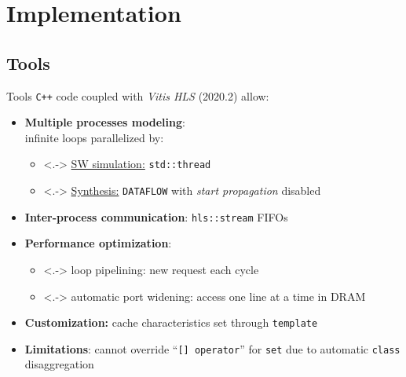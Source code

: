 \documentclass[handout]{beamer}
\begin{document}
\section{Implementation}
\subsection{Tools}
\begin{frame}{Tools}
	\texttt{C++} code coupled with \emph{Vitis HLS} (2020.2) allow:
	\pause
	\begin{itemize}[<+->]
		\item \textbf{Multiple processes modeling}:\\
			infinite loops parallelized by:
			\begin{itemize}
				\item<.-> \underline{SW simulation:} \texttt{std::thread}
				\item<.-> \underline{Synthesis:} \texttt{DATAFLOW} with
					\textit{start propagation} disabled
			\end{itemize}
		\item \textbf{Inter-process communication}: \texttt{hls::stream} FIFOs
		\item \textbf{Performance optimization}:
			\begin{itemize}
				\item<.-> loop pipelining: new request each cycle
				\item<.-> automatic port widening: access one line at a time in DRAM
			\end{itemize}
		\item \textbf{Customization:} cache characteristics set through
			\texttt{template}
		\item \textbf{Limitations}: cannot override ``\texttt{[]~operator}''
			for \texttt{set} due to automatic \texttt{class} disaggregation
	\end{itemize}
\end{frame}
\end{document}
